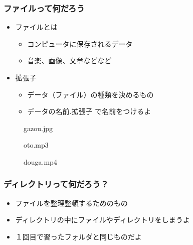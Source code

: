 \begin{frame}
    \frametitle{ファイルって何だろう}
    \begin{itemize}
        \item ファイルとは
        \begin{itemize}
            \item コンピュータに保存されるデータ
            \item 音楽、画像、文章などなど
        \end{itemize}
        \item 拡張子
        \begin{itemize}
            \item データ（ファイル）の種類を決めるもの
            \item データの名前.拡張子 で名前をつけるよ
        \end{itemize}
    \end{itemize}
    
    \begin{figure}[h]
    \centering
    \begin{minipage}[b]{0.32\columnwidth}
        \centering
        
        \caption{gazou.jpg}
    \end{minipage}
    \begin{minipage}[b]{0.32\columnwidth}
        \centering
        
        \caption{oto.mp3}
    \end{minipage}
    \begin{minipage}[b]{0.32\columnwidth}
        \centering
        
        \caption{douga.mp4}
    \end{minipage}
    \end{figure}
\end{frame}

\begin{frame}
    \frametitle{ディレクトリって何だろう？}
    \begin{itemize}
        \item ファイルを整理整頓するためのもの
        \item ディレクトリの中にファイルやディレクトリをしまうよ
        \item １回目で習ったフォルダと同じものだよ
    \end{itemize}
\end{frame}


